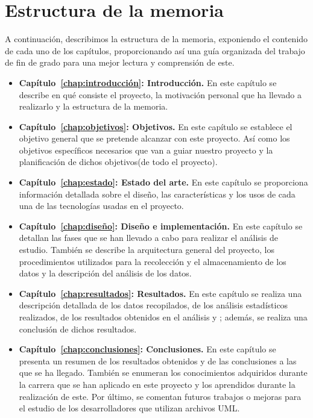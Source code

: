 \documentclass[a4paper, 12pt]{book}
\begin{document}
\section{Estructura de la memoria}
\label{sec:estructura}

A continuación, describimos la estructura de la memoria, exponiendo el contenido de cada uno de los capítulos, proporcionando así una guía organizada del trabajo de fin de grado para una mejor lectura y comprensión de este.

\begin{itemize}
  
  \item \textbf{Capítulo~\ref{chap:introducción}: Introducción.} En este capítulo se describe en qué consiste el proyecto, la motivación personal que ha llevado a realizarlo y la estructura de la memoria. 

  \item \textbf{Capítulo~\ref{chap:objetivos}: Objetivos.} En este capítulo se establece el objetivo general que se pretende alcanzar con este proyecto. 
  Así como los objetivos específicos necesarios que van a guiar nuestro proyecto y la planificación de dichos objetivos(de todo el proyecto). 
  
  \item \textbf{Capítulo~\ref{chap:estado}: Estado del arte.} En este capítulo se proporciona información detallada sobre el diseño, las características y los usos de cada una de las tecnologías usadas en el proyecto.  
  
  \item \textbf{Capítulo~\ref{chap:diseño}: Diseño e implementación.} En este capítulo se detallan las fases que se han llevado a cabo para realizar el análisis de estudio. 
  También se describe la arquitectura general del proyecto, los procedimientos utilizados para la recolección y el almacenamiento de los datos y la descripción del análisis de los datos.

  \item \textbf{Capítulo~\ref{chap:resultados}: Resultados.} En este capítulo se realiza una descripción detallada de los datos recopilados, de los análisis estadísticos realizados, de los resultados obtenidos en el análisis y ; además, se realiza una conclusión de dichos resultados.
 
  \item \textbf{Capítulo~\ref{chap:conclusiones}: Conclusiones.} En este capítulo se presenta un resumen de los resultados obtenidos y de las conclusiones a las que se ha llegado. 
  También se enumeran los conocimientos adquiridos durante la carrera que se han aplicado en este proyecto y los aprendidos durante la realización de este.
  Por último, se comentan futuros trabajos o mejoras para el estudio de los desarrolladores que utilizan archivos UML. 
  
  
\end{itemize}
\end{document}
